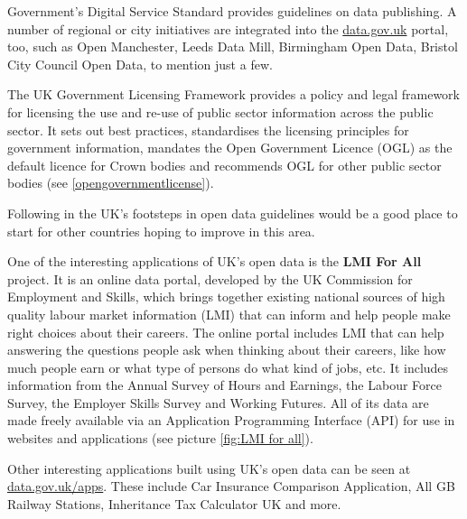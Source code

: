 \documentclass[thesis=B,english]{sprlajur-slovakopendata}[2018/05/12]
\begin{document}
Government’s Digital Service Standard provides guidelines on data publishing. A number of regional or city initiatives are integrated into the \linebreak\href{https://data.gov.uk}{data.gov.uk} portal, too, such as Open Manchester, Leeds Data Mill, Birmingham Open Data, Bristol City Council Open Data, to mention just a few.

The UK Government Licensing Framework provides a policy and legal framework for licensing the use and re-use of public sector information across the public sector. It sets out best practices, standardises the licensing principles for government information, mandates the Open Government Licence (OGL) as the default licence for Crown bodies and recommends OGL for other public sector bodies (see \ref{opengovernmentlicense}).

Following in the UK’s footsteps in open data guidelines would be a good place to start for other countries hoping to improve in this area.\cite{UKopendatagov}

One of the interesting applications of UK's open data is the \textbf{LMI For All} project. It is an online data portal, developed by the UK Commission for Employment and Skills, which brings together existing national sources of high quality labour market information (LMI) that can inform and help people make right choices about their careers. The online portal includes LMI that can help answering the questions people ask when thinking about their careers, like how much people earn or what type of persons do what kind of jobs, etc. It includes information from the Annual Survey of Hours and Earnings, the Labour Force Survey, the Employer Skills Survey and Working Futures. All of its data are made freely available  via an Application Programming Interface (API) for use in websites and applications (see picture \ref{fig:LMI for all}).

Other interesting applications built using UK's open data can be seen at \href{https://data.gov.uk/apps}{data.gov.uk/apps}. These include Car Insurance Comparison Application, All GB Railway Stations, Inheritance Tax Calculator UK and more.
\end{document}
